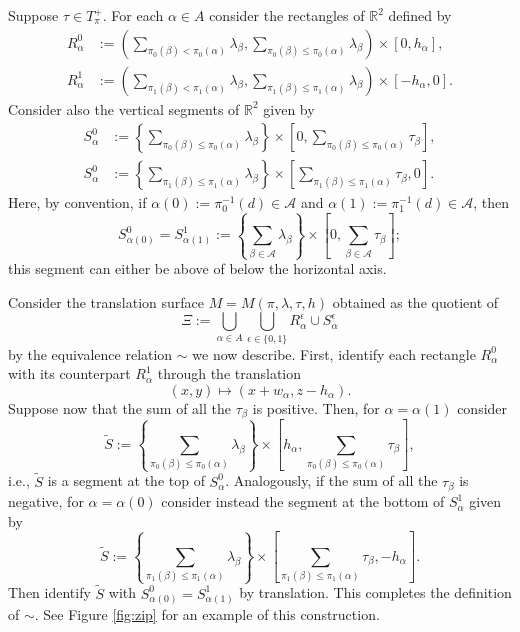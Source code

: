 \documentclass{amsart}
\theoremstyle{definition}
\theoremstyle{remark}
\numberwithin{equation}{section}
\newcommand{\<}{{\langle}}
\renewcommand{\>}{{\rangle}}
\begin{document}
Suppose $\tau \in T_\pi^+$. For each $\alpha \in A$ consider the rectangles of $\mathbb{R}^2$ defined by
\begin{align*}
    R_\alpha^0 &:=\left( \sum_{\pi_0(\beta) < \pi_0(\alpha) }\lambda_\beta, \sum_{\pi_0(\beta) \leq \pi_0(\alpha) }\lambda_\beta \right) \times [0,h_\alpha],\\
    R_\alpha^1 &:=\left( \sum_{\pi_1(\beta) < \pi_1(\alpha) }\lambda_\beta, \sum_{\pi_1(\beta) \leq \pi_1(\alpha) }\lambda_\beta \right) \times [-h_\alpha,0].
\end{align*}
Consider also the vertical segments of $\mathbb{R}^2$ given by
\begin{align*}
    S_\alpha^0 &:= \left\lbrace \sum_{\pi_0(\beta) \leq \pi_0(\alpha)} \lambda_\beta\right\rbrace \times \left[0, \sum_{\pi_0(\beta) \leq \pi_0(\alpha)} \tau_\beta \right],\\
    S_\alpha^0 &:= \left\lbrace \sum_{\pi_1(\beta) \leq \pi_1(\alpha)} \lambda_\beta\right\rbrace \times \left[\sum_{\pi_1(\beta) \leq \pi_1(\alpha)} \tau_\beta, 0 \right].
\end{align*}
Here, by convention, if $\alpha(0) := \pi_0^{-1}(d) \in \mathcal{A}$ and $\alpha(1) := \pi_1^{-1}(d) \in \mathcal{A}$, then
\[
S_{\alpha(0)}^0 = S_{\alpha(1)}^1 := \left\lbrace \sum_{\beta \in \mathcal{A}} \lambda_\beta\right\rbrace \times \left[0, \sum_{\beta \in \mathcal{A}} \tau_\beta \right];
\]
this segment can either be above of below the horizontal axis.

Consider the translation surface $M = M(\pi,\lambda,\tau,h)$ obtained as the quotient of
\[
\Xi :=\bigcup_{\alpha \in A} \bigcup_{\epsilon \in \{0,1\}} R_\alpha^\epsilon \cup S_{\alpha}^\epsilon
\]
by the equivalence relation $\sim$ we now describe. First, identify each rectangle $R_\alpha^0$ with its counterpart $R_\alpha^1$ through the translation
\[
(x,y) \mapsto (x + w_\alpha, z-h_\alpha).
\]
Suppose now that the sum of all the $\tau_\beta$ is positive. Then, for $\alpha = \alpha(1)$ consider
\[
\widetilde{S} := \left\lbrace \sum_{\pi_0(\beta) \leq \pi_0(\alpha)} \lambda_\beta \right\rbrace \times  \left[h_{\alpha}, \sum_{\pi_0(\beta) \leq \pi_0(\alpha)} \tau_\beta \right],
\]
i.e., $\widetilde{S}$ is a segment at the top of $S_\alpha^0$. Analogously, if the sum of all the $\tau_\beta$ is negative, for $\alpha = \alpha(0)$ consider instead the segment at the bottom of $S_\alpha^1$ given by
\[
\widetilde{S} := \left\lbrace \sum_{\pi_1(\beta) \leq \pi_1(\alpha)} \lambda_\beta \right\rbrace \times  \left[\sum_{\pi_1(\beta) \leq \pi_1(\alpha)} \tau_\beta ,-h_{\alpha}\right].
\]
Then identify $\widetilde{S}$ with $S_{\alpha(0)}^0 = S_{\alpha(1)}^1$ by translation. This completes the definition of $\sim$. See Figure \ref{fig:zip} for an example of this construction.
\end{document}
